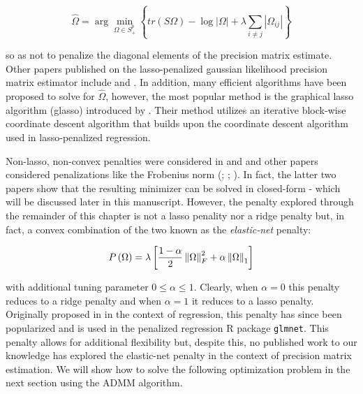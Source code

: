 \documentclass[11pt,]{report}
\theoremstyle{definition}
\theoremstyle{definition}
\theoremstyle{definition}
\theoremstyle{remark}
\begin{document}
\begin{equation}
\hat{\Omega} = \arg\min_{\Omega \in S_{+}^{p}}\left\{ tr\left(S\Omega\right) - \log\left|\Omega \right| + \lambda\sum_{i \neq j}\left|\Omega_{ij}\right| \right\}
\label{eq:omegapenlasso}
\end{equation}

so as not to penalize the diagonal elements of the precision matrix estimate. Other papers published on the lasso-penalized gaussian likelihood precision matrix estimator include \citet{rothman2008sparse} and \citet{friedman2008sparse}. In addition, many efficient algorithms have been proposed to solve for \(\hat{\Omega}\), however, the most popular method is the graphical lasso algorithm (glasso) introduced by \citet{friedman2008sparse}. Their method utilizes an iterative block-wise coordinate descent algorithm that builds upon the coordinate descent algorithm used in lasso-penalized regression.

Non-lasso, non-convex penalties were considered in \citet{lam2009sparsistency} and \citet{fan2009network} and other papers considered penalizations like the Frobenius norm (\citet{rothman2014existence}; \citet{witten2009covariance}; \citet{price2015ridge}). In fact, the latter two papers show that the resulting minimizer can be solved in closed-form - which will be discussed later in this manuscript. However, the penalty explored through the remainder of this chapter is not a lasso penality nor a ridge penalty but, in fact, a convex combination of the two known as the \emph{elastic-net} penalty:

\begin{equation}
P\left( \Omega \right) = \lambda\left[\frac{1 - \alpha}{2}\left\| \Omega \right\|_{F}^{2} + \alpha\left\| \Omega \right\|_{1} \right]
\label{eq:penelastic}\notag
\end{equation}

with additional tuning parameter \(0 \leq \alpha \leq 1\). Clearly, when \(\alpha = 0\) this penalty reduces to a ridge penalty and when \(\alpha = 1\) it reduces to a lasso penalty. Originally proposed in \citet{zou2005regularization} in the context of regression, this penalty has since been popularized and is used in the penalized regression R package \texttt{glmnet}. This penalty allows for additional flexibility but, despite this, no published work to our knowledge has explored the elastic-net penalty in the context of precision matrix estimation. We will show how to solve the following optimization problem in the next section using the ADMM algorithm.
\end{document}
